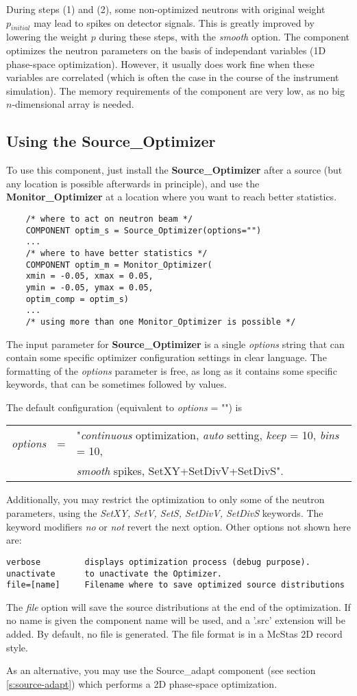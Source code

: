 During steps (1) and (2), some non-optimized neutrons with original
weight $p_{initial}$ may lead to spikes on detector signals. This is
greatly improved by lowering the weight $p$ during these steps, with the
{\it smooth} option.
The component optimizes the neutron parameters on the basis of
independant variables (1D phase-space optimization). However, it usually does work fine when these
variables are correlated (which is often the case in the course of the
instrument simulation).
The memory requirements of the component are very low, as no big
$n$-dimensional array is needed.

\subsection{Using the Source\_Optimizer}

To use this component, just install the {\bf Source\_Optimizer} after a
source (but any location is possible afterwards in principle), and use the {\bf
  Monitor\_Optimizer} at a location where you want to reach better
statistics.

\begin{verbatim}
    /* where to act on neutron beam */
    COMPONENT optim_s = Source_Optimizer(options="")
    ...
    /* where to have better statistics */
    COMPONENT optim_m = Monitor_Optimizer(
    xmin = -0.05, xmax = 0.05,
    ymin = -0.05, ymax = 0.05,
    optim_comp = optim_s)
    ...
    /* using more than one Monitor_Optimizer is possible */
\end{verbatim}

The input parameter for {\bf Source\_Optimizer} is a single {\it
  options} string that can contain some specific optimizer configuration
settings in clear language. The formatting of the {\it options}
parameter is free, as long as it contains some specific keywords, that
can be sometimes followed by values.

The default configuration (equivalent to {\it options} = "") is
\begin{center}
\begin{tabular}{rcl}
  {\it options} & = & "{\it continuous} optimization,
  {\it auto} setting, {\it keep} = 10, {\it bins} = 10, \\
  & & {\it smooth} spikes, SetXY+SetDivV+SetDivS".
\end{tabular}
\end{center}
Additionally, you may restrict the optimization to only some of the neutron parameters, using the {\it SetXY, SetV, SetS, SetDivV, SetDivS} keywords.
The keyword modifiers {\it no} or {\it not} revert the next option.
Other options not shown here are:
\begin{verbatim}
verbose         displays optimization process (debug purpose).
unactivate      to unactivate the Optimizer.
file=[name]     Filename where to save optimized source distributions
\end{verbatim}
The {\it file} option will save the source distributions at the end of
the optimization. If no name is given the component name will be used,
and a '.src' extension will be added. By default, no file is generated.
The file format is in a McStas 2D record style.

As an alternative, you may use the Source\_adapt component (see section \ref{s:source-adapt}) which performs a 2D phase-space optimization.
